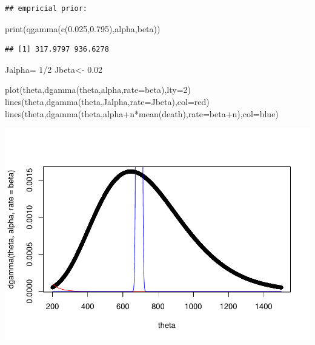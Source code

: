 \documentclass[
]{book}
\newenvironment{Shaded}{\begin{snugshade}}{\end{snugshade}}
\newcommand{\AttributeTok}[1]{\textcolor[rgb]{0.77,0.63,0.00}{#1}}
\newcommand{\DecValTok}[1]{\textcolor[rgb]{0.00,0.00,0.81}{#1}}
\newcommand{\FloatTok}[1]{\textcolor[rgb]{0.00,0.00,0.81}{#1}}
\newcommand{\FunctionTok}[1]{\textcolor[rgb]{0.00,0.00,0.00}{#1}}
\newcommand{\NormalTok}[1]{#1}
\newcommand{\OtherTok}[1]{\textcolor[rgb]{0.56,0.35,0.01}{#1}}
\newcommand{\SpecialCharTok}[1]{\textcolor[rgb]{0.00,0.00,0.00}{#1}}
\newcommand{\StringTok}[1]{\textcolor[rgb]{0.31,0.60,0.02}{#1}}
\theoremstyle{definition}
\theoremstyle{definition}
\theoremstyle{definition}
\theoremstyle{definition}
\theoremstyle{remark}
\begin{document}
\begin{verbatim}
## empricial prior:
\end{verbatim}

\begin{Shaded}
\begin{Highlighting}[]
  \FunctionTok{print}\NormalTok{(}\FunctionTok{qgamma}\NormalTok{(}\FunctionTok{c}\NormalTok{(}\FloatTok{0.025}\NormalTok{,}\FloatTok{0.795}\NormalTok{),alpha,beta))}
\end{Highlighting}
\end{Shaded}

\begin{verbatim}
## [1] 317.9797 936.6278
\end{verbatim}

\begin{Shaded}
\begin{Highlighting}[]
\NormalTok{  Jalpha}\OtherTok{=} \DecValTok{1}\SpecialCharTok{/}\DecValTok{2}
\NormalTok{   Jbeta}\OtherTok{\textless{}{-}} \FloatTok{0.02} 
   
   
 \FunctionTok{plot}\NormalTok{(theta,}\FunctionTok{dgamma}\NormalTok{(theta,alpha,}\AttributeTok{rate=}\NormalTok{beta),}\AttributeTok{lty=}\DecValTok{2}\NormalTok{)}
 \FunctionTok{lines}\NormalTok{(theta,}\FunctionTok{dgamma}\NormalTok{(theta,Jalpha,}\AttributeTok{rate=}\NormalTok{Jbeta),}\AttributeTok{col=}\StringTok{\textquotesingle{}red\textquotesingle{}}\NormalTok{)}
\FunctionTok{lines}\NormalTok{(theta,}\FunctionTok{dgamma}\NormalTok{(theta,alpha}\SpecialCharTok{+}\NormalTok{n}\SpecialCharTok{*}\FunctionTok{mean}\NormalTok{(death),}\AttributeTok{rate=}\NormalTok{beta}\SpecialCharTok{+}\NormalTok{n),}\AttributeTok{col=}\StringTok{\textquotesingle{}blue\textquotesingle{}}\NormalTok{)}
\end{Highlighting}
\end{Shaded}

\includegraphics{_main_files/figure-latex/unnamed-chunk-26-1.pdf}
\end{document}
